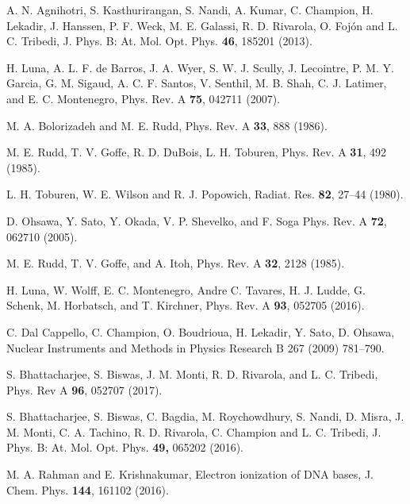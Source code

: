 \documentclass[10pt,showpacs,showkeys,twocolumn]{revtex4-1}
\begin{document}
\begin{thebibliography}{}
A. N. Agnihotri, S. Kasthurirangan, S. Nandi, A. Kumar, C. Champion, 
H. Lekadir, J. Hanssen, P. F. Weck, M. E. Galassi, R. D. Rivarola, 
O. Foj\'on and L. C. Tribedi, 
J. Phys. B: At. Mol. Opt. Phys. \textbf{46}, 185201 (2013).

H. Luna, A. L. F. de Barros, J. A. Wyer, S. W. J. Scully, J. Lecointre, 
P. M. Y. Garcia, G. M. Sigaud, A. C. F. Santos, V. Senthil, M. B. Shah, 
C. J. Latimer, and E. C. Montenegro,
Phys. Rev. A \textbf{75}, 042711 (2007).

M. A. Bolorizadeh and M. E. Rudd, 
Phys. Rev. A \textbf{33}, 888 (1986). 

M. E. Rudd, T. V. Goffe, R. D. DuBois, L. H. Toburen, 
Phys. Rev. A \textbf{31}, 492 (1985). 

L. H. Toburen, W. E. Wilson and R. J. Popowich,
Radiat. Res. \textbf{82}, 27--44 (1980).

D. Ohsawa, Y. Sato, Y. Okada, V. P. Shevelko, and F. Soga
Phys. Rev. A \textbf{72}, 062710 (2005).

M. E. Rudd, T. V. Goffe, and A. Itoh, 
Phys. Rev. A \textbf{32}, 2128 (1985).


H. Luna, W. Wolff, E. C. Montenegro, Andre C. Tavares, H. J. Ludde, 
G. Schenk, M. Horbatsch, and T. Kirchner, 
Phys. Rev. A \textbf{93}, 052705 (2016).  

C. Dal Cappello, C. Champion, O. Boudrioua, H. Lekadir, Y. Sato, 
D. Ohsawa, 
Nuclear Instruments and Methods in Physics Research B 267 (2009) 781--790.

S. Bhattacharjee, S. Biswas, J. M. Monti, R. D. Rivarola, and 
L. C. Tribedi,
Phys. Rev A \textbf{96}, 052707 (2017).

S. Bhattacharjee, S. Biswas, C. Bagdia, M. Roychowdhury, S. Nandi, 
D. Misra, J. M. Monti, C. A. Tachino, R. D. Rivarola, C. Champion and 
L. C. Tribedi, J. 
Phys. B: At. Mol. Opt. Phys. \textbf{49,}  065202 (2016).

M. A. Rahman and E. Krishnakumar,
Electron ionization of DNA bases,
J. Chem. Phys. \textbf{144}, 161102 (2016).



\end{thebibliography}
\end{document}
